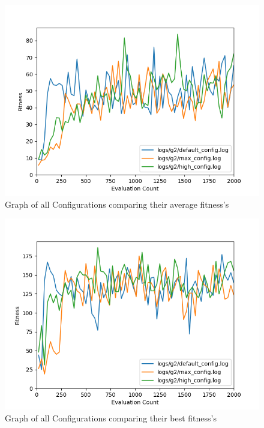 \begin{figure}[H]
    \centering
    \includegraphics[width=1\linewidth]{images/graphs/config_compare_avg.png}
    \caption{Graph of all Configurations comparing their average fitness's}
    \label{config_avg}
\end{figure}

\begin{figure}[H]
    \centering
    \includegraphics[width=1\linewidth]{images/graphs/config_compare_best.png}
    \caption{Graph of all Configurations comparing their best fitness's}
    \label{config_best}
\end{figure}



